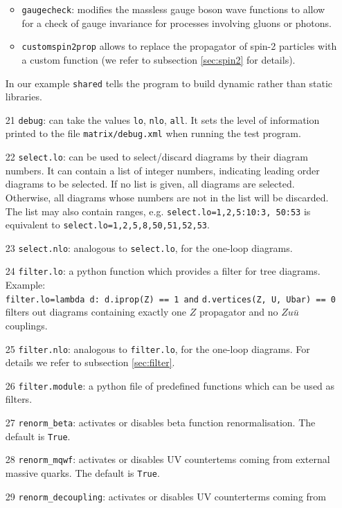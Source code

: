 \documentclass[11pt,a4paper]{refrep}
\begin{document}
\begin{enumerate}
\begin{itemize}
\item {\tt gaugecheck}:  modifies the massless gauge boson wave functions to allow for
a check of gauge invariance for processes involving 
gluons or photons. 
\item {\tt customspin2prop} allows to replace the propagator of spin-2 particles  
with a custom function (we refer to subsection \ref{sec:spin2} for details).
\end{itemize}
In our example {\tt shared} tells the program to 
build dynamic rather than static libraries.
\item[21] \texttt{debug}: can take the values  {\tt lo}, {\tt nlo}, {\tt all}.
It sets the level of information printed to the file {\tt matrix/debug.xml} when running the test program.
\item[22] \texttt{select.lo}: can be used to select/discard diagrams by their diagram numbers.
It can contain a list of integer numbers, indicating leading order diagrams to be
selected. If no list is given, all diagrams are selected.       
Otherwise, all diagrams whose numbers are not in the list will be discarded.          
The list may also contain ranges, e.g.                                    
{\tt select.lo=1,2,5:10:3, 50:53} is equivalent to {\tt select.lo=1,2,5,8,50,51,52,53}.      
\item[23] \texttt{select.nlo}: analogous to \texttt{select.lo},  for the one-loop diagrams.
\item[24] \texttt{filter.lo}:  a python function which provides a filter for tree diagrams.    
Example:  \\  
{\tt filter.lo=lambda d: d.iprop(Z) == 1  and}
{\tt  d.vertices(Z, U, Ubar) == 0 } filters out
diagrams containing exactly one $Z$ propagator and no $Zu\bar{u}$ couplings. 
\item[25] \texttt{filter.nlo}:  analogous to \texttt{filter.lo},  for the one-loop diagrams.
For details we refer to subsection \ref{sec:filter}.
\item[26] \texttt{filter.module}: a python file of predefined functions which can be used as filters.   
\item[27] \texttt{renorm\_beta}: activates or disables beta function renormalisation. The default is  {\tt True}. 
\item[28] \texttt{renorm\_mqwf}:  activates or disables UV countertems coming from
external massive quarks. The default is  {\tt True}.
\item[29] \texttt{renorm\_decoupling}:   activates or disables UV counterterms coming from  

\end{enumerate}
\end{document}
